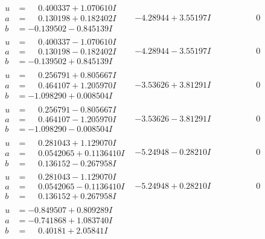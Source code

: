 \documentclass[1p]{elsarticle_modified}
\theoremstyle{definition}
\begin{document}
$$\begin{array}{c|c|c}
\begin{aligned}
u &= \phantom{-}0.400337 + 1.070610 I \\
a &= \phantom{-}0.130198 + 0.182402 I \\
b &= -0.139502 - 0.845139 I\end{aligned}
 & -4.28944 + 3.55197 I & \phantom{-0.000000 } 0 \\ \hline\begin{aligned}
u &= \phantom{-}0.400337 - 1.070610 I \\
a &= \phantom{-}0.130198 - 0.182402 I \\
b &= -0.139502 + 0.845139 I\end{aligned}
 & -4.28944 - 3.55197 I & \phantom{-0.000000 } 0 \\ \hline\begin{aligned}
u &= \phantom{-}0.256791 + 0.805667 I \\
a &= \phantom{-}0.464107 + 1.205970 I \\
b &= -1.098290 + 0.008504 I\end{aligned}
 & -3.53626 + 3.81291 I & \phantom{-0.000000 } 0 \\ \hline\begin{aligned}
u &= \phantom{-}0.256791 - 0.805667 I \\
a &= \phantom{-}0.464107 - 1.205970 I \\
b &= -1.098290 - 0.008504 I\end{aligned}
 & -3.53626 - 3.81291 I & \phantom{-0.000000 } 0 \\ \hline\begin{aligned}
u &= \phantom{-}0.281043 + 1.129070 I \\
a &= \phantom{-}0.0542065 + 0.1136410 I \\
b &= \phantom{-}0.136152 - 0.267958 I\end{aligned}
 & -5.24948 - 0.28210 I & \phantom{-0.000000 } 0 \\ \hline\begin{aligned}
u &= \phantom{-}0.281043 - 1.129070 I \\
a &= \phantom{-}0.0542065 - 0.1136410 I \\
b &= \phantom{-}0.136152 + 0.267958 I\end{aligned}
 & -5.24948 + 0.28210 I & \phantom{-0.000000 } 0 \\ \hline\begin{aligned}
u &= -0.849507 + 0.809289 I \\
a &= -0.741868 + 1.083740 I \\
b &= \phantom{-}0.40181 + 2.05841 I\end{aligned}

\end{array}$$
\end{document}
